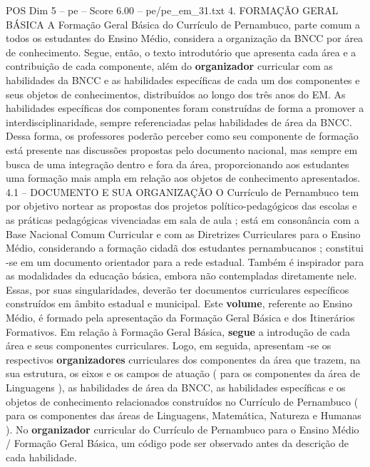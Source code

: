 \begin{textsample}{POS Dim 5 – pe – Score 6.00 – pe/pe\_em\_31.txt}  \label{ex:f5_pos_201}
4.
FORMAÇÃO GERAL BÁSICA A Formação Geral Básica do Currículo de Pernambuco, parte comum a todos os estudantes do Ensino Médio, considera a organização da BNCC por área de conhecimento.
Segue, então, o texto introdutório que apresenta cada área e a contribuição de cada componente, além do \textbf{organizador} curricular com as habilidades da BNCC e as habilidades específicas de cada um dos componentes e seus objetos de conhecimentos, distribuídos ao longo dos três anos do EM.
As habilidades específicas dos componentes foram construídas de forma a promover a interdisciplinaridade, sempre referenciadas pelas habilidades de área da BNCC.
Dessa forma, os professores poderão perceber como seu componente de formação está presente nas discussões propostas pelo documento nacional, mas sempre em busca de uma integração dentro e fora da área, proporcionando aos estudantes uma formação mais ampla em relação aos objetos de conhecimento apresentados. 4.1 – DOCUMENTO E SUA ORGANIZAÇÃO O Currículo de Pernambuco tem por objetivo nortear as propostas dos projetos político-pedagógicos das escolas e as práticas pedagógicas vivenciadas em sala de aula ; está em consonância com a Base Nacional Comum Curricular e com as Diretrizes Curriculares para o Ensino Médio, considerando a formação cidadã dos estudantes pernambucanos ; constitui -se em um documento orientador para a rede estadual.
Também é inspirador para as modalidades da educação básica, embora não contempladas diretamente nele.
Essas, por suas singularidades, deverão ter documentos curriculares específicos construídos em âmbito estadual e municipal.
Este \textbf{volume}, referente ao Ensino Médio, é formado pela apresentação da Formação Geral Básica e dos Itinerários Formativos.
Em relação à Formação Geral Básica, \textbf{segue} a introdução de cada área e seus componentes curriculares.
Logo, em seguida, apresentam -se os respectivos \textbf{organizadores} curriculares dos componentes da área que trazem, na sua estrutura, os eixos e os campos de atuação ( para os componentes da área de Linguagens ), as habilidades de área da BNCC, as habilidades específicas e os objetos de conhecimento relacionados construídos no Currículo de Pernambuco ( para os componentes das áreas de Linguagens, Matemática, Natureza e Humanas ).
No \textbf{organizador} curricular do Currículo de Pernambuco para o Ensino Médio / Formação Geral Básica, um código pode ser observado antes da descrição de cada habilidade.

\end{textsample}
